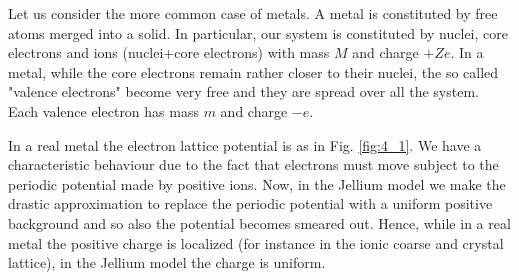 \documentclass[../main/main.tex]{subfiles}
\begin{document}

Let us consider the more common case of metals. A metal is constituted by free atoms merged into a solid. In particular, our system is constituted by nuclei, core electrons and ions (nuclei+core electrons) with mass \( M \) and charge  \( +Ze \). In a metal, while the core electrons remain rather closer to their nuclei, the so called "valence electrons" become very free and they are spread over all the system. Each valence electron has mass \( m \) and charge \( -e \).



In a real metal the electron lattice potential is as in Fig. \ref{fig:4_1}. We have a characteristic behaviour due to the fact that electrons must move subject to the periodic potential made by positive ions. Now, in the Jellium model we make the drastic approximation to replace the periodic potential with a uniform positive background and so also the potential becomes smeared out. Hence, while in a real metal the positive charge is localized (for instance in the ionic coarse and crystal lattice), in the Jellium model the charge is uniform.  
\end{document}
